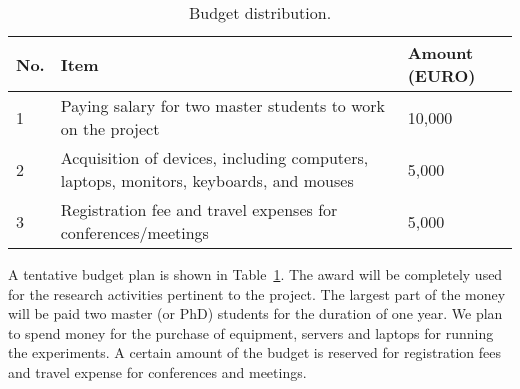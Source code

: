 \begin{table}[h!]
	\centering
	\vspace{-.2cm}
	\footnotesize
	\caption{Budget distribution.}
	\begin{tabular}{| p{0.6cm}|p{9.6cm} | l |}
		\hline
		\textbf{No.}  & \textbf{Item} &  \textbf{Amount (EURO)}  \\ \hline
		1  & Paying salary for two master students to work on the project & 10,000  \\ \hline
		2 & Acquisition of devices, including computers, laptops, monitors, keyboards, and mouses & 5,000 \\ \hline
		3 & Registration fee and travel expenses for conferences/meetings & 5,000 \\ \hline
	\end{tabular}
	\vspace{-.2cm}
	\label{tab:Budget}
\end{table}

A tentative budget plan is shown in Table~\ref{tab:Budget}. The award will be completely used for the research activities pertinent to the project. The largest part of the money will be paid two master (or PhD) students for the duration of one year. We plan to spend money for the purchase of equipment, \eg servers and laptops for running the experiments. A certain amount of the budget is reserved for registration fees and travel expense for conferences and meetings. %

%
%
